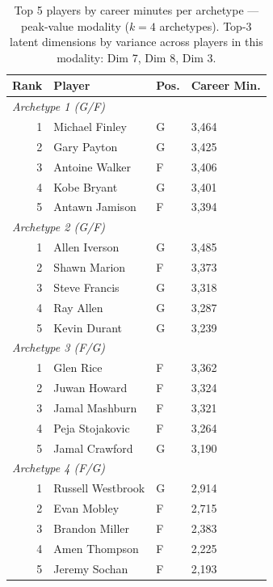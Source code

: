 \begin{table}[htbp]
  \centering\small
  \begin{tabular}{rlll}
    \toprule
    Rank & Player & Pos. & Career Min. \\
    \midrule
    \multicolumn{4}{l}{\textit{Archetype 1 (G/F)}} \\
    \midrule
    1 & Michael Finley & G & 3,464 \\
    2 & Gary Payton & G & 3,425 \\
    3 & Antoine Walker & F & 3,406 \\
    4 & Kobe Bryant & G & 3,401 \\
    5 & Antawn Jamison & F & 3,394 \\
    \midrule[0.4pt]
    \multicolumn{4}{l}{\textit{Archetype 2 (G/F)}} \\
    \midrule
    1 & Allen Iverson & G & 3,485 \\
    2 & Shawn Marion & F & 3,373 \\
    3 & Steve Francis & G & 3,318 \\
    4 & Ray Allen & G & 3,287 \\
    5 & Kevin Durant & G & 3,239 \\
    \midrule[0.4pt]
    \multicolumn{4}{l}{\textit{Archetype 3 (F/G)}} \\
    \midrule
    1 & Glen Rice & F & 3,362 \\
    2 & Juwan Howard & F & 3,324 \\
    3 & Jamal Mashburn & F & 3,321 \\
    4 & Peja Stojakovic & F & 3,264 \\
    5 & Jamal Crawford & G & 3,190 \\
    \midrule[0.4pt]
    \multicolumn{4}{l}{\textit{Archetype 4 (F/G)}} \\
    \midrule
    1 & Russell Westbrook & G & 2,914 \\
    2 & Evan Mobley & F & 2,715 \\
    3 & Brandon Miller & F & 2,383 \\
    4 & Amen Thompson & F & 2,225 \\
    5 & Jeremy Sochan & F & 2,193 \\
    \bottomrule
  \end{tabular}
  \caption{Top 5 players by career minutes per archetype --- peak-value modality ($k=4$ archetypes). Top-3 latent dimensions by variance across players in this modality: Dim 7, Dim 8, Dim 3.}
  \label{tab:arch_reps_peak_value}
\end{table}

